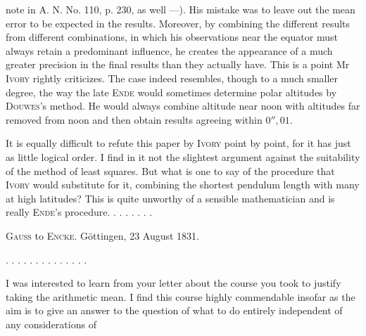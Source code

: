note in A. N. No. 110, p. 230, as well —). His mistake was to leave out the mean error to be expected in the results. Moreover, by combining the different results from different combinations, in which his observations near the equator must always retain a predominant influence, he creates the appearance of a much greater precision in the final results than they actually have. This is a point Mr \textsc{Ivory} rightly criticizes. The case indeed resembles, though to a much smaller degree, the way the late \textsc{Ende} would sometimes determine polar altitudes by \textsc{Douwes}'s method. He would always combine  altitude near noon with  altitudes far removed from noon and then obtain results agreeing within $0'',01$.

It is equally difficult to refute this paper by \textsc{Ivory} point by point, for it has just as little logical order. I find in it not the slightest argument against the suitability of the method of least squares. But what is one to say of the procedure that \textsc{Ivory} would substitute for it, combining the shortest pendulum length with many at high latitudes? This is quite unworthy of a sensible mathematician and is really \textsc{Ende}'s procedure. . . . . . . .

\begin{center}\textsc{Gauss} to \textsc{Encke}. Göttingen, 23 August 1831.\end{center}

. . . . . . . . . . . . . .

I was interested to learn from your letter about the course you took to justify taking the arithmetic mean. I find this course highly commendable insofar as the aim is to give an answer to the question of what to do entirely independent of any considerations of\space%
